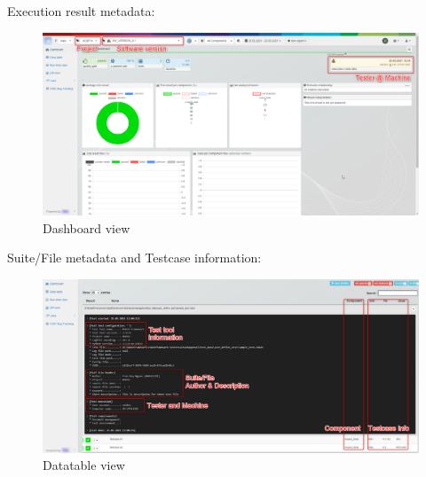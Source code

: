 Execution result metadata:

\begin{figure}[h!]
  \includegraphics[width=1\linewidth]{./pictures/Dashboard.png}
  \caption{Dashboard view}
\end{figure}

Suite/File metadata and Testcase information:

\begin{figure}[h!]
  \includegraphics[width=1\linewidth]{./pictures/Datatable.png}
  \caption{Datatable view}
\end{figure}